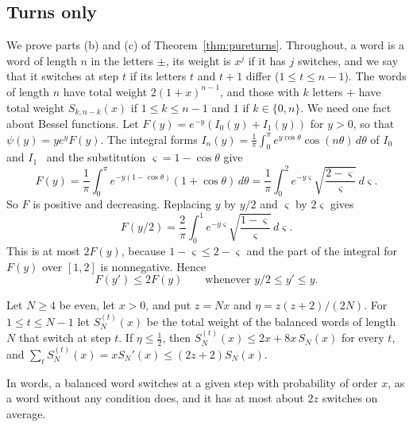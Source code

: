 \subsection{Turns only}

We prove parts (b) and (c) of Theorem~\ref{thm:pureturns}. Throughout, a word is a word of length
$n$ in the letters $\pm$, its weight is $x^j$ if it has $j$ switches, and we say that it switches at
step $t$ if its letters $t$ and $t+1$ differ ($1\le t\le n-1$). The words of length $n$ have total
weight $2(1+x)^{n-1}$, and those with $k$ letters $+$ have total weight $S_{k,n-k}(x)$ if
$1\le k\le n-1$ and $1$ if $k\in\{0,n\}$. We need one fact about Bessel functions. Let
$F(y)=e^{-y}(I_0(y)+I_1(y))$ for $y>0$, so that $\psi(y)=ye^yF(y)$. The integral forms
$I_n(y)=\frac1\pi\int_0^\pi e^{y\cos\theta}\cos(n\theta)\,d\theta$ of $I_0$ and
$I_1$~\cite[Eq.~10.32.3]{dlmf} and the substitution $\varsigma=1-\cos\theta$ give
\[
 F(y)=\frac1\pi\int_0^\pi e^{-y(1-\cos\theta)}(1+\cos\theta)\,d\theta
 =\frac1\pi\int_0^2e^{-y\varsigma}\sqrt{\frac{2-\varsigma}\varsigma}\,d\varsigma .
\]
So $F$ is positive and decreasing. Replacing $y$ by $y/2$ and $\varsigma$ by $2\varsigma$ gives
\[
 F(y/2)=\frac2\pi\int_0^1e^{-y\varsigma}\sqrt{\frac{1-\varsigma}\varsigma}\,d\varsigma .
\]
This is at most $2F(y)$, because $1-\varsigma\le2-\varsigma$ and the part of the integral for
$F(y)$ over $[1,2]$ is nonnegative. Hence
\begin{equation}\label{eq:app-planar-F}
 F(y')\le2F(y)\qquad\text{whenever }y/2\le y'\le y .
\end{equation}

\begin{lemma}\label{lem:oneswitch}
Let $N\ge4$ be even, let $x>0$, and put $z=Nx$ and $\eta=z(z+2)/(2N)$. For $1\le t\le N-1$ let
$S^{(t)}_N(x)$ be the total weight of the balanced words of length $N$ that switch at step $t$. If
$\eta\le\frac12$, then $S^{(t)}_N(x)\le2x+8x\,S_N(x)$ for every $t$, and
$\sum_tS^{(t)}_N(x)=xS_N'(x)\le(2z+2)S_N(x)$.
\end{lemma}

In words, a balanced word switches at a given step with probability of order $x$, as a word
without any condition does, and it has at most about $2z$ switches on average.

